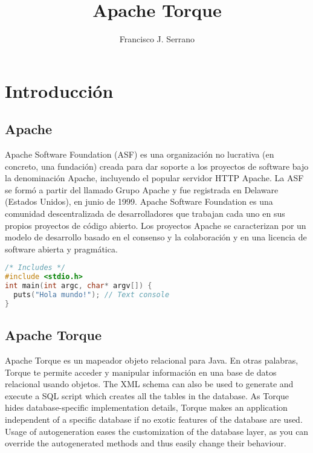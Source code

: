 \documentclass[12pt, oneside]{article}
\title{Apache Torque}
\author{Francisco J. Serrano}
\begin{document}
\maketitle
\tableofcontents

\section{Introducción}

\subsection{Apache}
Apache Software Foundation (ASF) es una organización no lucrativa (en concreto, una fundación) creada para dar soporte a los proyectos de software bajo la denominación Apache, incluyendo el popular servidor HTTP Apache. La ASF se formó a partir del llamado Grupo Apache y fue registrada en Delaware (Estados Unidos), en junio de 1999.
Apache Software Foundation es una comunidad descentralizada de desarrolladores que trabajan cada uno en sus propios proyectos de código abierto. Los proyectos Apache se caracterizan por un modelo de desarrollo basado en el consenso y la colaboración y en una licencia de software abierta y pragmática.

\begin{lstlisting}[language=C]
/* Includes */
#include <stdio.h>
int main(int argc, char* argv[]) {
  puts("Hola mundo!"); // Text console
}
\end{lstlisting}

\subsection{Apache Torque}
Apache Torque es un mapeador objeto relacional para Java. En otras palabras, Torque te permite acceder y manipular información en una base de datos relacional usando objetos. 
The XML schema can also be used to generate and execute a SQL script which creates all the tables in the database.
As Torque hides database-specific implementation details, Torque makes an application independent of a specific database if no exotic features of the database are used.
Usage of autogeneration eases the customization of the database layer, as you can override the autogenerated methods and thus easily change their behaviour.
\end{document}
